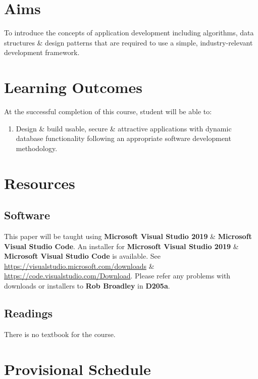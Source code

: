 \documentclass{article}
\begin{document}
\section*{Aims}
To introduce the concepts of application development including algorithms, data structures \& design patterns that are required to use a simple, industry-relevant development framework.

\section*{Learning Outcomes}
At the successful completion of this course, student will be able to:
\begin{enumerate}
	\item Design \& build usable, secure \& attractive applications with dynamic database
	      functionality following an appropriate software development methodology.
\end{enumerate}

\section*{Resources}

\subsection*{Software}
This paper will be taught using \textbf{Microsoft Visual Studio 2019} \& \textbf{Microsoft Visual Studio Code}. An installer for \textbf{Microsoft Visual Studio 2019} \&  \textbf{Microsoft Visual Studio Code} is available. See \href{https://visualstudio.microsoft.com/downloads}{https://visualstudio.microsoft.com/downloads} \& \href{https://code.visualstudio.com/Download}{https://code.visualstudio.com/Download}. Please refer any problems with downloads or installers to \textbf{Rob Broadley} in \textbf{D205a}.

\subsection*{Readings}
There is no textbook for the course.

\section*{Provisional Schedule}
\end{document}
